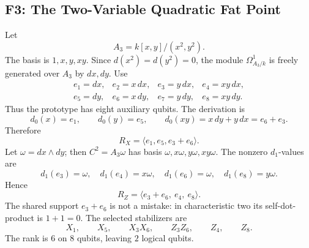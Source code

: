 \subsection{F3: The Two-Variable Quadratic Fat Point}
Let
\[
  A_3=k[x,y]/(x^2,y^2).
\]
The basis is \(1,x,y,xy\).  Since \(d(x^2)=d(y^2)=0\), the module
\(\Omega^1_{A_3/k}\) is freely generated over \(A_3\) by \(dx,dy\).  Use
\[
\begin{array}{llll}
e_1=dx,& e_2=x\,dx,& e_3=y\,dx,& e_4=xy\,dx,\\
e_5=dy,& e_6=x\,dy,& e_7=y\,dy,& e_8=xy\,dy.
\end{array}
\]
Thus the prototype has eight auxiliary qubits.  The derivation is
\[
  d_0(x)=e_1,\qquad d_0(y)=e_5,\qquad d_0(xy)=x\,dy+y\,dx=e_6+e_3.
\]
Therefore
\[
  R_X=\langle e_1,e_5,e_3+e_6\rangle.
\]
Let \(\omega=dx\wedge dy\); then \(C^2=A_3\omega\) has basis
\(\omega,x\omega,y\omega,xy\omega\).  The nonzero \(d_1\)-values are
\[
  d_1(e_3)=\omega,\quad d_1(e_4)=x\omega,\quad
  d_1(e_6)=\omega,\quad d_1(e_8)=y\omega.
\]
Hence
\[
  R_Z=\langle e_3+e_6,\ e_4,\ e_8\rangle.
\]
The shared support \(e_3+e_6\) is not a mistake: in characteristic two its
self-dot-product is \(1+1=0\).  The selected stabilizers are
\[
  X_1,\qquad X_5,\qquad X_3X_6,\qquad Z_3Z_6,\qquad Z_4,\qquad Z_8.
\]
The rank is \(6\) on \(8\) qubits, leaving \(2\) logical qubits.
